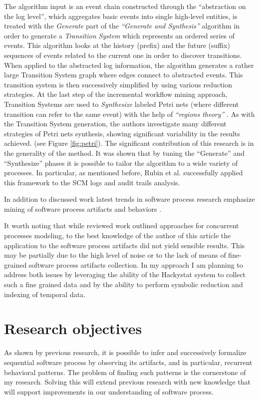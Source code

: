 \documentclass{sig-alternate}
\begin{document}
The algorithm input is an event chain constructed through the ``abstraction on the log level'', which aggregates basic events into single high-level entities, is treated with the \textit{Generate} part of the \textit{``Generate and Synthesis''} \cite{citeulike:3718014} algorithm in order to generate a \textit{Transition System} which represents an ordered series of events. This algorithm looks at the history (prefix) and the future (suffix) sequences of events related to the current one in order to discover transitions.  When applied to the abstracted log information, the algorithm generates a rather large Transition System graph where edges connect to abstracted events. This transition system is then successively simplified by using various reduction strategies. At the last step of the incremental workflow mining approach, Transition Systems are used to \textit{Synthesize} labeled Petri nets (where different transition can refer to the same event) with the help of \textit{``regions theory''} \cite{citeulike:5128170}. As with the Transition System generation, the authors investigate many different strategies of Petri nets synthesis, showing significant variability in the results achieved. (see Figure \ref{fig:petri}). The significant contribution of this research is in the generality of the method. It was shown that by tuning the ``Generate'' and ``Synthesize'' phases it is possible to tailor the algorithm to a wide variety of processes. In particular, as mentioned before, Rubin et al. successfully applied this framework to the SCM logs and audit trails analysis.

In addition to discussed work latest trends in software process research emphasize mining of software process artifacts and behaviors \cite{citeulike:5043664} \cite{citeulike:5112229}. 

It worth noting that while reviewed work outlined approaches for concurrent processes modeling, to the best knowledge of the author of this article the application to the software process artifacts did not yield sensible results. This may be partially due to the high level of noise or to the lack of means of fine-grained software process artifacts collection. In my approach I am planning to address both issues by leveraging the ability of the Hackystat system \cite{citeulike:4041809} to collect such a fine grained data and by the ability to perform symbolic reduction and indexing of temporal data.

\section{Research objectives}
As shown by previous research, it is possible to infer and successively formalize sequential software process by observing its artifacts, and in particular, recurrent behavioral patterns. The problem of finding such patterns is the cornerstone of my research. Solving this will extend previous research with new knowledge that will support improvements in our understanding of software process.
\end{document}
